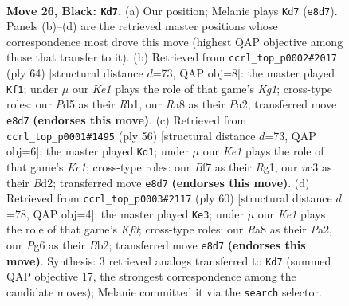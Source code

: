 \documentclass[11pt]{article}
\begin{document}
\clearpage

\begin{figure}[p]\centering
\begin{subfigure}{0.46\textwidth}\centering
\resizebox{\linewidth}{!}{%
\newchessgame
\chessboard[
  setfen={rn2k2Q/pp3b2/1p2p1p1/1P1pP3/1P1P4/2N4B/8/4K1N1 b - - 6 26},
  showmover=false,
  pgfstyle=straightmove, color=movearrow, markmove={e8-d7}
]}
\caption{}
\end{subfigure}\hfill
\begin{subfigure}{0.46\textwidth}\centering
\resizebox{\linewidth}{!}{%
\newchessgame
\chessboard[
  setfen={6k1/1p6/4n3/1N1rb1pp/5p2/5PP1/P4B1P/1R4K1 w - - 0 33},
  showmover=false,
  pgfstyle=straightmove, color=movearrow, markmove={g1-f1}
]}
\caption{}
\end{subfigure}
\\[4pt]
\begin{subfigure}{0.46\textwidth}\centering
\resizebox{\linewidth}{!}{%
\newchessgame
\chessboard[
  setfen={8/1p1kbp2/1n2pp2/1p3P2/1P4Br/P2P4/3B1P2/2K3R1 w - - 1 29},
  showmover=false,
  pgfstyle=straightmove, color=movearrow, markmove={c1-d1}
]}
\caption{}
\end{subfigure}\hfill
\begin{subfigure}{0.46\textwidth}\centering
\resizebox{\linewidth}{!}{%
\newchessgame
\chessboard[
  setfen={8/1pb1k2p/p3nnp1/5p2/P1N2P2/5KP1/PB5P/3B4 w - - 4 31},
  showmover=false,
  pgfstyle=straightmove, color=movearrow, markmove={f3-e3}
]}
\caption{}
\end{subfigure}
\caption{\textbf{Move 26, Black: \texttt{Kd7}.} (a) Our position; Melanie plays \texttt{Kd7} (\texttt{e8d7}). Panels (b)--(d) are the retrieved master positions whose correspondence most drove this move (highest QAP objective among those that transfer to it). (b) Retrieved from \texttt{ccrl\_top\_p0002\#2017} (ply 64) [structural distance $d$=73, QAP obj=8]: the master played \texttt{Kf1}; under $\mu$ our \emph{Ke1} plays the role of that game's \emph{Kg1}; cross-type roles: our \emph{P}d5 as their \emph{R}b1, our \emph{R}a8 as their \emph{P}a2; transferred move \texttt{e8d7} \textbf{(endorses this move)}. (c) Retrieved from \texttt{ccrl\_top\_p0001\#1495} (ply 56) [structural distance $d$=73, QAP obj=6]: the master played \texttt{Kd1}; under $\mu$ our \emph{Ke1} plays the role of that game's \emph{Kc1}; cross-type roles: our \emph{B}f7 as their \emph{R}g1, our \emph{n}c3 as their \emph{B}d2; transferred move \texttt{e8d7} \textbf{(endorses this move)}. (d) Retrieved from \texttt{ccrl\_top\_p0003\#2117} (ply 60) [structural distance $d$=78, QAP obj=4]: the master played \texttt{Ke3}; under $\mu$ our \emph{Ke1} plays the role of that game's \emph{Kf3}; cross-type roles: our \emph{R}a8 as their \emph{P}a2, our \emph{P}g6 as their \emph{B}b2; transferred move \texttt{e8d7} \textbf{(endorses this move)}. Synthesis: 3 retrieved analogs transferred to \texttt{Kd7} (summed QAP objective 17, the strongest correspondence among the candidate moves); Melanie committed it via the \texttt{search} selector.}
\label{fig:thought-m51}
\end{figure}
\end{document}
